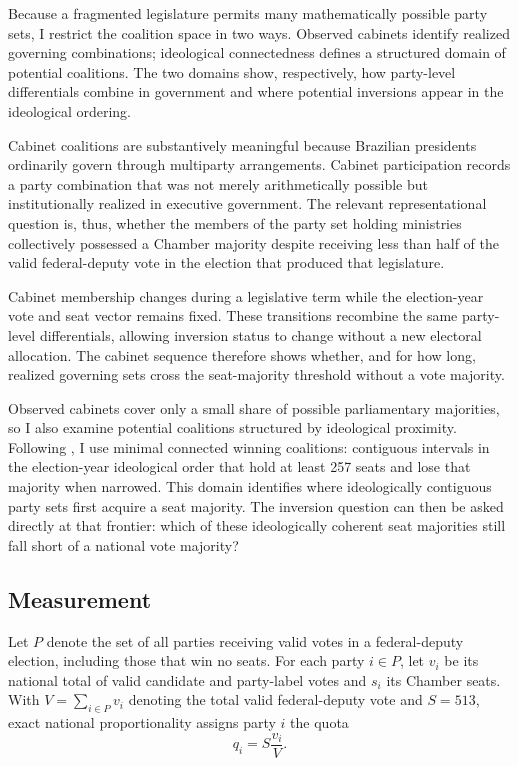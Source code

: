\documentclass[11pt]{article}
\begin{document}
Because a fragmented legislature permits many mathematically possible party
sets, I restrict the coalition space in two ways. Observed cabinets identify
realized governing combinations; ideological connectedness defines a structured
domain of potential coalitions. The two domains show, respectively, how
party-level differentials combine in government and where potential inversions
appear in the ideological ordering.

Cabinet coalitions are substantively meaningful because Brazilian presidents ordinarily govern through multiparty arrangements. Cabinet participation records a party combination that was not merely arithmetically possible but institutionally realized in executive government. The relevant representational question is, thus, whether the members of the party set holding ministries collectively possessed a Chamber majority despite receiving less than half of the valid federal-deputy vote in the election that produced that legislature.

Cabinet membership changes during a legislative term while the election-year
vote and seat vector remains fixed. These transitions recombine the same
party-level differentials, allowing inversion status to change without a new
electoral allocation. The cabinet sequence therefore shows whether, and for how
long, realized governing sets cross the seat-majority threshold without a vote
majority.

Observed cabinets cover only a small share of possible parliamentary majorities,
so I also examine potential coalitions structured by ideological proximity.
Following \textcite{axelrod1970conflict}, I use minimal connected winning
coalitions: contiguous intervals in the election-year ideological order that
hold at least 257 seats and lose that majority when narrowed. This domain
identifies where ideologically contiguous party sets first acquire a seat
majority. The inversion question can then be asked directly at that frontier:
which of these ideologically coherent seat majorities still fall short of a
national vote majority?


\subsection{Measurement }

Let \(P\) denote the set of all parties receiving valid votes in a
federal-deputy election, including those that win no seats. For each party \(i\in P\),
let \(v_i\) be its national total of valid candidate and party-label
votes and \(s_i\) its Chamber seats. With \(V=\sum_{i\in P}v_i\) denoting
the total valid federal-deputy vote and \(S=513\), exact national
proportionality assigns party \(i\) the quota
\[
q_i=S\frac{v_i}{V}.
\]
\end{document}
